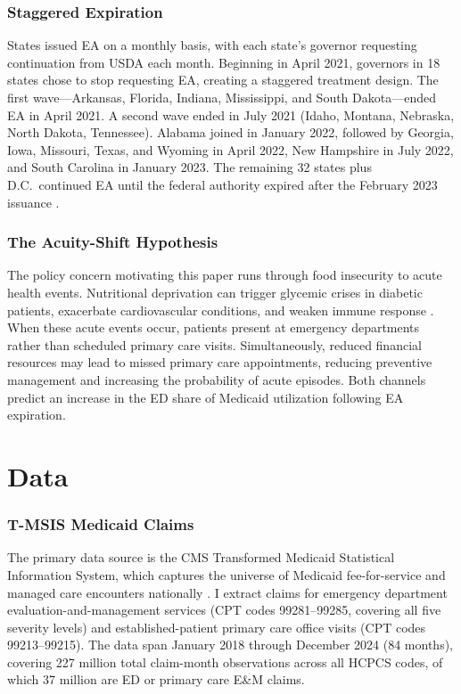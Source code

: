 \documentclass[12pt]{article}
\begin{document}
\subsubsection*{Staggered Expiration} States issued EA on a monthly basis, with each state's governor requesting continuation from USDA each month. Beginning in April 2021, governors in 18 states chose to stop requesting EA, creating a staggered treatment design. The first wave---Arkansas, Florida, Indiana, Mississippi, and South Dakota---ended EA in April 2021. A second wave ended in July 2021 (Idaho, Montana, Nebraska, North Dakota, Tennessee). Alabama joined in January 2022, followed by Georgia, Iowa, Missouri, Texas, and Wyoming in April 2022, New Hampshire in July 2022, and South Carolina in January 2023. The remaining 32 states plus D.C.\ continued EA until the federal authority expired after the February 2023 issuance \citep{cbpp2023snap}.

\subsubsection*{The Acuity-Shift Hypothesis} The policy concern motivating this paper runs through food insecurity to acute health events. Nutritional deprivation can trigger glycemic crises in diabetic patients, exacerbate cardiovascular conditions, and weaken immune response \citep{seligman2010food, berkowitz2018food}. When these acute events occur, patients present at emergency departments rather than scheduled primary care visits. Simultaneously, reduced financial resources may lead to missed primary care appointments, reducing preventive management and increasing the probability of acute episodes. Both channels predict an increase in the ED share of Medicaid utilization following EA expiration.

\section{Data}

\subsubsection*{T-MSIS Medicaid Claims} The primary data source is the CMS Transformed Medicaid Statistical Information System, which captures the universe of Medicaid fee-for-service and managed care encounters nationally \citep{cms2024tmsis}. I extract claims for emergency department evaluation-and-management services (CPT codes 99281--99285, covering all five severity levels) and established-patient primary care office visits (CPT codes 99213--99215). The data span January 2018 through December 2024 (84 months), covering 227 million total claim-month observations across all HCPCS codes, of which 37 million are ED or primary care E\&M claims.
\end{document}
